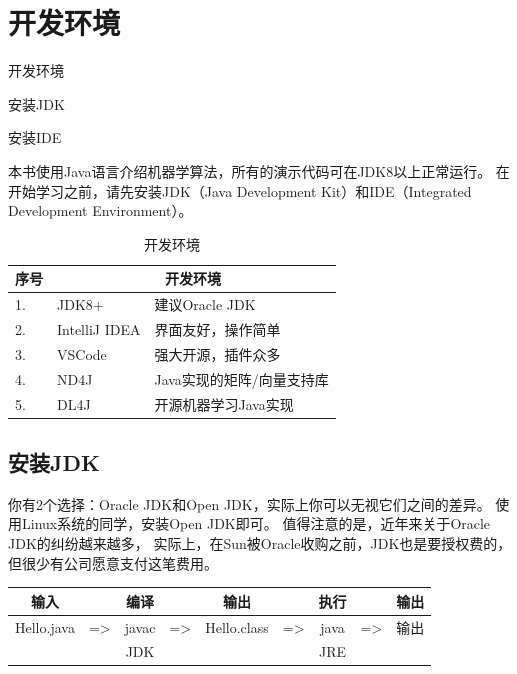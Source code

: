 \chapter{开发环境}

\begin{introduction}
	\item 开发环境
	\item 安装JDK
	\item 安装IDE
\end{introduction}

本书使用Java语言介绍机器学算法，所有的演示代码可在JDK8以上正常运行。
在开始学习之前，请先安装JDK（Java Development Kit）和IDE（Integrated Development Environment）。

\begin{table}[!htbp]\centering
	\caption{开发环境}
	\begin{tabular}{|p{1cm}|p{3cm}|p{8cm}|}
	\toprule
	序号 & \multicolumn{2}{|c|}{开发环境}\\
	\midrule
	1. & JDK8+&建议Oracle JDK\\
	\hline
	2. & IntelliJ IDEA&界面友好，操作简单\\
	\hline
	3. & VSCode&强大开源，插件众多\\
	\hline
	4. & ND4J&Java实现的矩阵/向量支持库\\
	\hline
	5. & DL4J&开源机器学习Java实现\\
	\bottomrule
	\end{tabular}
\end{table}

\section{安装JDK}
你有2个选择：Oracle JDK和Open JDK，实际上你可以无视它们之间的差异。
使用Linux系统的同学，安装Open JDK即可。
值得注意的是，近年来关于Oracle JDK的纠纷越来越多，
实际上，在Sun被Oracle收购之前，JDK也是要授权费的，但很少有公司愿意支付这笔费用。
\bigskip
\begin{table}[!htbp]\centering \small
	\begin{tabular}{cc|c|ccc|c|cc}
		\toprule
		输入&&编译&&输出&&执行&&输出 \\
		\midrule
		Hello.java&=>&javac&=>&Hello.class&=>&java&=>&输出 \\
		&&JDK&&&&JRE&& \\
		\bottomrule
	\end{tabular}
\end{table}

